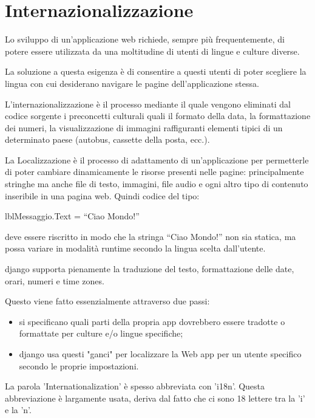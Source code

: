 \section{Internazionalizzazione}\label{intern}
Lo sviluppo di un’applicazione web richiede, sempre più frequentemente, di potere essere utilizzata da una moltitudine di utenti di lingue e culture diverse.

La soluzione a questa esigenza è di consentire a questi utenti di poter scegliere la lingua con cui desiderano navigare le pagine dell’applicazione stessa.

L'internazionalizzazione è il processo mediante il quale vengono eliminati dal codice sorgente i preconcetti culturali quali il formato della data, la formattazione dei numeri, la visualizzazione di immagini raffiguranti elementi tipici di un determinato paese (autobus, cassette della posta, ecc.). 

La Localizzazione è il processo di adattamento di un’applicazione per permetterle di poter cambiare dinamicamente le risorse presenti nelle pagine: principalmente stringhe ma anche file di testo, immagini, file audio e ogni altro tipo di contenuto inseribile in una pagina web.
Quindi codice del tipo:

lblMessaggio.Text = “Ciao Mondo!”

deve essere riscritto in modo che la stringa “Ciao Mondo!” non sia statica, ma possa variare in modalità runtime secondo la lingua scelta dall’utente.

django supporta pienamente la traduzione del testo, formattazione delle date, orari, numeri e  time zones.

Questo viene fatto essenzialmente attraverso due passi:
\begin{itemize}
	\item si specificano quali parti della propria app dovrebbero essere tradotte o formattate per culture e/o lingue specifiche;
	\item django usa questi "ganci" per localizzare la Web app per un utente specifico secondo le proprie impostazioni.
\end{itemize}

La parola 'Internationalization' è spesso abbreviata con 'i18n'. Questa abbreviazione è largamente usata, deriva dal fatto che ci sono 18 lettere tra la 'i' e la 'n'.

